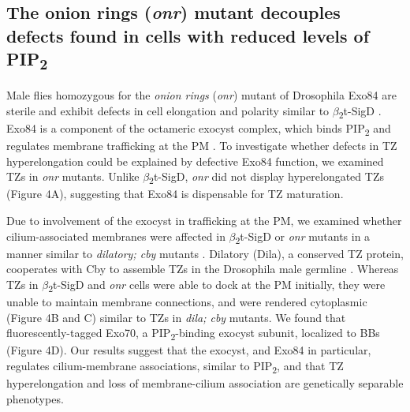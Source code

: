 \documentclass[12pt, twoside, letterpaper]{article}
\newcommand{\PIP}{PIP\textsubscript{2}}
\newcommand{\sigd}{$\beta$\textsubscript{2}t-SigD}
\begin{document}
\begin{doublespacing}
\begin{linenumbers}
    \subsection*{The onion rings (\textit{onr}) mutant decouples defects found in cells with reduced levels of \PIP{}}
    Male flies homozygous for the \textit{onion rings}
    (\textit{onr}) mutant of Drosophila Exo84 are sterile and exhibit defects
    in cell elongation and polarity
    similar to \sigd{} \citep{wei2008depletion}.
    Exo84 is a component of the octameric exocyst complex, which binds
    \PIP{} and regulates membrane trafficking at the PM 
    \citep{he2007exo70}.
    To investigate whether defects in TZ hyperelongation could be explained by
    defective Exo84 function, we examined TZs in \textit{onr} mutants.
    Unlike \sigd{}, \textit{onr} did not display hyperelongated TZs (Figure 4A),
    suggesting that Exo84 is dispensable for TZ maturation.

    Due to involvement of the exocyst in trafficking at the PM,
    we examined whether cilium-associated membranes were affected in \sigd{}
    or \textit{onr} mutants in a manner similar to \textit{dilatory; cby} mutants
    \citep{vieillard2016transition}. 
    Dilatory (Dila), a conserved TZ protein, cooperates with Cby to assemble TZs in
    the Drosophila male germline \citep{vieillard2016transition}.
    Whereas TZs in \sigd{} and \textit{onr} cells were able to dock
    at the PM initially, they were unable to maintain
    membrane connections, and were rendered cytoplasmic (Figure 4B and C) similar to TZs in
    \textit{dila; cby} mutants.
    We found that fluorescently-tagged Exo70, a \PIP{}-binding exocyst subunit,
    localized to BBs (Figure 4D).
    Our results suggest that the exocyst, and Exo84 in particular, regulates
    cilium-membrane associations, similar to \PIP{}, and that TZ hyperelongation and loss of
    membrane-cilium association are genetically separable phenotypes.


\end{linenumbers}
\end{doublespacing}
\end{document}
